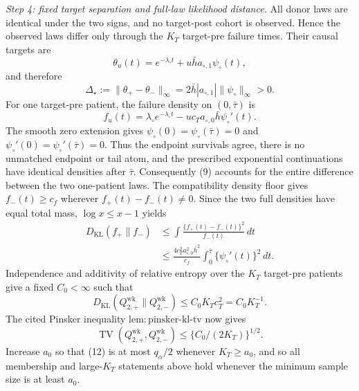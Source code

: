 \emph{Step 4: fixed target separation and full-law likelihood distance.}
All donor laws are identical under the two signs, and no target-post cohort is observed.  Hence the observed laws differ only through the \(K_T\) target-pre failure times.  Their causal targets are
\[
 \theta_u(t)=e^{-\lambda_\circ t}+u\bar h a_{\circ,1}\psi_\circ(t),
\]
and therefore
\[
 \Delta_\star:=\|\theta_+-\theta_-\|_\infty
 =2\bar h|a_{\circ,1}|\|\psi_\circ\|_\infty>0.        \tag{8}
\]
For one target-pre patient, the failure density on \((0,\bar\tau)\) is
\[
 f_u(t)=\lambda_\circ e^{-\lambda_\circ t}
       -u c_Ta_{\circ,0}\bar h\psi_\circ'(t).          \tag{9}
\]
The smooth zero extension gives \(\psi_\circ(0)=\psi_\circ(\bar\tau)=0\) and \(\psi_\circ'(0)=\psi_\circ'(\bar\tau)=0\).  Thus the endpoint survivals agree, there is no unmatched endpoint or tail atom, and the prescribed exponential continuations have identical densities after \(\bar\tau\).  Consequently (9) accounts for the entire difference between the two one-patient laws.  The compatibility density floor gives \(f_-(t)\ge c_f\) wherever \(f_+(t)-f_-(t)\ne0\).  Since the two full densities have equal total mass, \(\log x\le x-1\) yields
\[
 \begin{aligned}
 D_{\mathrm{KL}}(f_+\|f_-)
 &\le\int\frac{\{f_+(t)-f_-(t)\}^2}{f_-(t)}\,dt\\
 &\le\frac{4c_T^2a_{\circ,0}^2\bar h^2}{c_f}
       \int_0^{\bar\tau}\{\psi_\circ'(t)\}^2\,dt.
 \end{aligned}                                          \tag{10}
\]
Independence and additivity of relative entropy over the \(K_T\) target-pre patients give a fixed \(C_0<\infty\) such that
\[
 D_{\mathrm{KL}}(Q_{2,+}^{\mathrm{wk}}\|Q_{2,-}^{\mathrm{wk}})
 \le C_0K_Tc_T^2=C_0K_T^{-1}.                           \tag{11}
\]
The cited Pinsker inequality \(\mathrm{lem:pinsker\mbox{-}kl\mbox{-}tv}\) now gives
\[
 \operatorname{TV}(Q_{2,+}^{\mathrm{wk}},Q_{2,-}^{\mathrm{wk}})
 \le\{C_0/(2K_T)\}^{1/2}.                              \tag{12}
\]
Increase \(a_0\) so that (12) is at most \(q_\alpha/2\) whenever \(K_T\ge a_0\), and so all membership and large-\(K_T\) statements above hold whenever the minimum sample size is at least \(a_0\).

